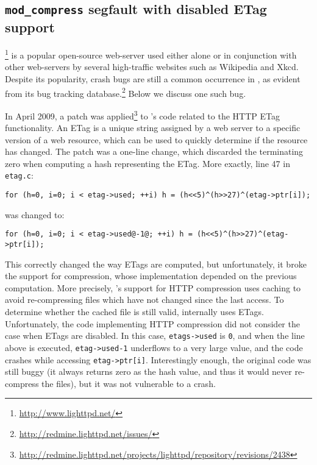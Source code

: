 \subsection{\lighttpd \lstinline`mod_compress` segfault with disabled ETag support}

\lighttpd\footnote{\url{http://www.lighttpd.net/}} is a popular open-source 
web-server used either alone or in conjunction with other web-servers
by several high-traffic websites such as Wikipedia and Xkcd.
Despite its popularity, crash bugs are still a common
occurrence in \lighttpd, as evident from its bug tracking
database.\footnote{\url{http://redmine.lighttpd.net/issues/}}  Below
we discuss one such bug.

In April 2009, a patch was
applied\footnote{\url{http://redmine.lighttpd.net/projects/lighttpd/repository/revisions/2438}}
to \lighttpd's code related to the HTTP ETag functionality.  An ETag
is a unique string assigned by a web server to a specific version of a
web resource, which can be used to quickly determine if the resource
has changed.  The patch was a one-line change, which discarded the
terminating zero when computing a hash representing the ETag.  More
exactly, line 47 in \texttt{etag.c}:

\begin{lstlisting}[numbers=none,breaklines=true,xleftmargin=0pt]
for (h=0, i=0; i < etag->used; ++i) h = (h<<5)^(h>>27)^(etag->ptr[i]);
\end{lstlisting}
\noindent was changed to:
\begin{lstlisting}[numbers=none,breaklines=true,xleftmargin=0pt]
for (h=0, i=0; i < etag->used@-1@; ++i) h = (h<<5)^(h>>27)^(etag->ptr[i]);
\end{lstlisting}

This correctly changed the way ETags are computed, but unfortunately,
it broke the support for compression, whose implementation depended on
the previous computation.  More precisely, \lighttpd's support for HTTP
compression uses caching to avoid re-compressing files which have not
changed since the last access.  To determine whether the cached
file is still valid, \lighttpd internally uses ETags.  Unfortunately,
the code implementing HTTP compression did not consider the case when
ETags are disabled.  In this case, \lstinline`etags->used`
is \lstinline`0`, and when the line above is
executed, \lstinline`etag->used-1` underflows to a very large value, and
the code crashes while accessing \lstinline`etag->ptr[i]`.
Interestingly enough, the original code was still buggy (it always
returns zero as the hash value, and thus it would never re-compress
the files), but it was not vulnerable to a crash.

